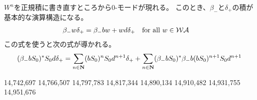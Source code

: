 {	$W^n$を正規積に書き直すところから0-モードが現れる。
	このとき、$\beta_-$と$\delta_+$の積が基本的な演算構造になる。
	\begin{equation*}\begin{split}
		\beta_-w\delta_+ &= \beta_-bw + wd\delta_+
			\quad\text{for all } w\in{\ensuremath{{\mathcal{W}}}}{\ensuremath{{\mathcal{A}}}}
	\end{split}\end{equation*}
	この式を使うと次の式が導かれる。
	\begin{equation*}\begin{split}
		(\beta_-bS_0)^*S_0d\delta_+
			= \sum_{n\in\mathbf{N}} (bS_0)^nS_0d^{n+1}\delta_+
			+ \sum_{n\in\mathbf{N}} (\beta_-bS_0)^*\beta_-b(bS_0)^{n+1}S_0d^{n+1} \\
	\end{split}
	\end{equation*}

\begin{todo}[ここまで]\label{todo:ここまで} %
14,742,697
14,766,507
14,797,783
14,817,344
14,890,134
14,910,482
14,931,755
14,951,676
\end{todo} %

}
